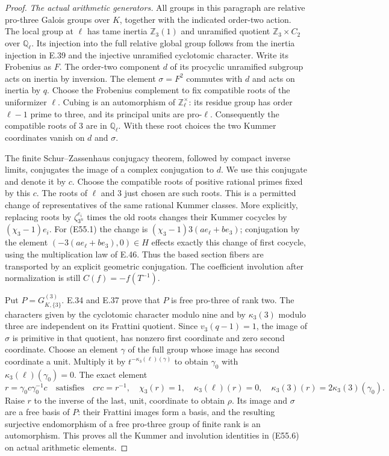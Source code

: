 \begin{proof}
\emph{The actual arithmetic generators.}
All groups in this paragraph are relative pro-three Galois
groups over $K$, together with the indicated order-two action.
The local group at $\ell$ has tame inertia $\mathbb Z_3(1)$
and unramified quotient $\mathbb Z_3\times C_2$ over
$\mathbb Q_\ell$. Its injection into the full relative global
group follows from the inertia injection in E.39 and the
injective unramified cyclotomic character. Write its Frobenius
as $F$. The order-two component $d$ of its procyclic unramified
subgroup acts on inertia by inversion. The element
$\sigma=F^2$ commutes with $d$ and acts on inertia by $q$.
Choose the Frobenius complement to fix compatible roots of the
uniformizer $\ell$. Cubing is an automorphism of
$\mathbb Z_\ell^\times$: its residue group has order
$\ell-1$ prime to three, and its principal units are pro-$\ell$.
Consequently the compatible roots of $3$ are in $\mathbb Q_\ell$.
With these root choices the two Kummer coordinates vanish on
$d$ and $\sigma$.

The finite Schur--Zassenhaus conjugacy theorem, followed by
compact inverse limits, conjugates the image of a complex
conjugation to $d$. We use this conjugate and denote it by $c$.
Choose the compatible roots of positive rational primes fixed
by this $c$. The roots of $\ell$ and $3$ just chosen are such
roots. This is a permitted change of representatives of the
same rational Kummer classes. More explicitly, replacing roots
by $\zeta_{3^n}^{e_i}$ times the old roots changes their Kummer
cocycles by $(\chi_3-1)e_i$. For (E55.1) the change is
$(\chi_3-1)3(ae_\ell+be_3)$; conjugation by the element
$(-3(ae_\ell+be_3),0)\in H$ effects exactly this change of first
cocycle, using the multiplication law of E.46. Thus the based
section fibers are transported by an explicit geometric
conjugation. The coefficient involution after normalization is
still $C(f)=-f(T^{-1})$.

Put $P=G_{K,\{3\}}^{(3)}$. E.34 and E.37 prove that $P$ is
free pro-three of rank two. The characters given by the
cyclotomic character modulo nine and by $\kappa_3(3)$ modulo
three are independent on its Frattini quotient. Since
$v_3(q-1)=1$, the image of $\sigma$ is primitive in that
quotient, has nonzero first coordinate and zero second
coordinate. Choose an element $\gamma$ of the full group whose
image has second coordinate a unit. Multiply it by
$t^{-\kappa_3(\ell)(\gamma)}$ to obtain $\gamma_0$ with
$\kappa_3(\ell)(\gamma_0)=0$. The exact element
\[
 r=\gamma_0c\gamma_0^{-1}c
 \quad\text{satisfies}\quad
 crc=r^{-1},\quad\chi_3(r)=1,\quad
 \kappa_3(\ell)(r)=0,\quad
 \kappa_3(3)(r)=2\kappa_3(3)(\gamma_0).
 \tag{E55.8}
\]
Raise $r$ to the inverse of the last, unit, coordinate to
obtain $\rho$. Its image and $\sigma$ are a free basis of $P$:
their Frattini images form a basis, and the resulting
surjective endomorphism of a free pro-three group of finite
rank is an automorphism. This proves all the Kummer and
involution identities in (E55.6) on actual arithmetic elements.


\end{proof}

